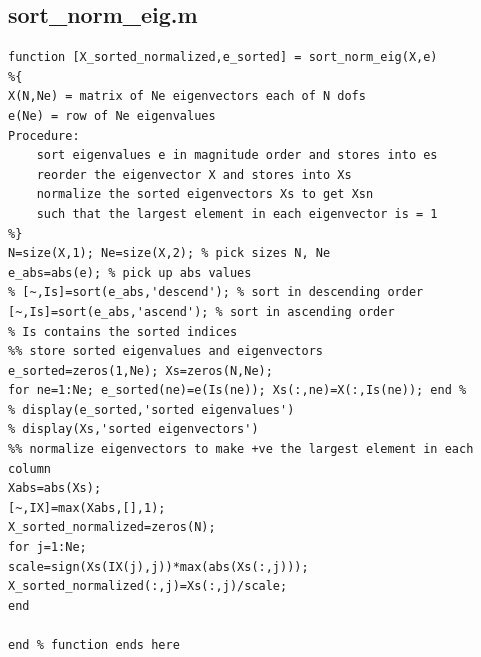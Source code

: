 \documentclass{article}
\begin{document}
\newpage
\subsection{sort\_norm\_eig.m}
\begin{lstlisting}[caption={Helper script for Homework 1.}, label={lst:main_script}]
function [X_sorted_normalized,e_sorted] = sort_norm_eig(X,e)
%{
X(N,Ne) = matrix of Ne eigenvectors each of N dofs
e(Ne) = row of Ne eigenvalues
Procedure:
    sort eigenvalues e in magnitude order and stores into es
    reorder the eigenvector X and stores into Xs
    normalize the sorted eigenvectors Xs to get Xsn
    such that the largest element in each eigenvector is = 1
%}
N=size(X,1); Ne=size(X,2); % pick sizes N, Ne
e_abs=abs(e); % pick up abs values
% [~,Is]=sort(e_abs,'descend'); % sort in descending order
[~,Is]=sort(e_abs,'ascend'); % sort in ascending order
% Is contains the sorted indices
%% store sorted eigenvalues and eigenvectors
e_sorted=zeros(1,Ne); Xs=zeros(N,Ne);
for ne=1:Ne; e_sorted(ne)=e(Is(ne)); Xs(:,ne)=X(:,Is(ne)); end %
% display(e_sorted,'sorted eigenvalues')
% display(Xs,'sorted eigenvectors')
%% normalize eigenvectors to make +ve the largest element in each column
Xabs=abs(Xs);
[~,IX]=max(Xabs,[],1);
X_sorted_normalized=zeros(N);
for j=1:Ne;
scale=sign(Xs(IX(j),j))*max(abs(Xs(:,j)));
X_sorted_normalized(:,j)=Xs(:,j)/scale;
end

end % function ends here
\end{lstlisting}
\end{document}
